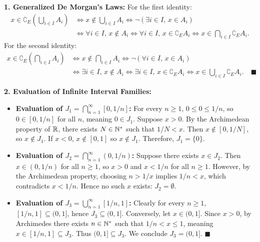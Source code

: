 \begin{solution}
\textbf{1. Generalized De Morgan's Laws:}
For the first identity:
\begin{align*}
x \in \complement_E \left(\bigcup_{i \in I} A_i\right) &\iff x \notin \bigcup_{i \in I} A_i \iff \neg\left(\exists i \in I,\, x \in A_i\right) \\
&\iff \forall i \in I,\, x \notin A_i \iff \forall i \in I,\, x \in \complement_E A_i \iff x \in \bigcap_{i \in I} \complement_E A_i.
\end{align*}
For the second identity:
\begin{align*}
x \in \complement_E \left(\bigcap_{i \in I} A_i\right) &\iff x \notin \bigcap_{i \in I} A_i \iff \neg\left(\forall i \in I,\, x \in A_i\right) \\
&\iff \exists i \in I,\, x \notin A_i \iff \exists i \in I,\, x \in \complement_E A_i \iff x \in \bigcup_{i \in I} \complement_E A_i. \quad \blacksquare
\end{align*}

\textbf{2. Evaluation of Infinite Interval Families:}
\begin{itemize}[leftmargin=1.5em,itemsep=2pt]
  \item \textbf{Evaluation of $J_1 = \bigcap_{n=1}^\infty [0, 1/n]$:}
  For every $n \ge 1$, $0 \le 0 \le 1/n$, so $0 \in [0, 1/n]$ for all $n$, meaning $0 \in J_1$.
  Suppose $x > 0$. By the Archimedean property of $\mathbb{R}$, there exists $N \in \mathbb{N}^*$ such that $1/N < x$. Then $x \notin [0, 1/N]$, so $x \notin J_1$.
  If $x < 0$, $x \notin [0, 1]$ so $x \notin J_1$.
  Therefore, $J_1 = \{0\}$.
  \item \textbf{Evaluation of $J_2 = \bigcap_{n=1}^\infty (0, 1/n)$:}
  Suppose there exists $x \in J_2$. Then $x \in (0, 1/n)$ for all $n \ge 1$, so $x > 0$ and $x < 1/n$ for all $n \ge 1$.
  However, by the Archimedean property, choosing $n > 1/x$ implies $1/n < x$, which contradicts $x < 1/n$.
  Hence no such $x$ exists: $J_2 = \emptyset$.
  \item \textbf{Evaluation of $J_3 = \bigcup_{n=1}^\infty [1/n, 1]$:}
  Clearly for every $n \ge 1$, $[1/n, 1] \subseteq (0, 1]$, hence $J_3 \subseteq (0, 1]$.
  Conversely, let $x \in (0, 1]$. Since $x > 0$, by Archimedes there exists $n \in \mathbb{N}^*$ such that $1/n < x \le 1$, meaning $x \in [1/n, 1] \subseteq J_3$.
  Thus $(0, 1] \subseteq J_3$.
  We conclude $J_3 = (0, 1]$. \hfill $\blacksquare$
\end{itemize}
\end{solution}

